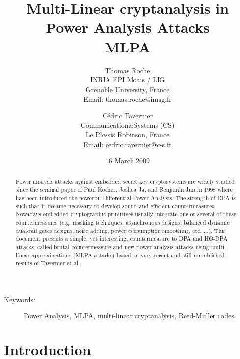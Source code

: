 \documentclass[11pt,a4paper]{article}
\title{Multi-Linear cryptanalysis in Power Analysis Attacks \\ MLPA}
\author{
Thomas Roche \\
INRIA EPI Moais / LIG \\
Grenoble University, France \\
Email: thomas.roche@imag.fr
\and
C\'{e}dric Tavernier \\
Communication\&Systems (CS)\\
 Le Plessis Robinson, France \\
Email: cedric.tavernier@c-s.fr
}
\date{16 March 2009}
\begin{document}
\maketitle

\begin{abstract}
Power analysis attacks against embedded secret key cryptosystems are widely studied since the seminal paper of Paul Kocher, Joshua Ja, and Benjamin Jun in 1998 where has been introduced 
the powerful Differential Power Analysis. The strength of DPA is such that it became necessary to develop sound and efficient countermeasures. Nowadays embedded cryptographic primitives 
usually integrate one or several of these countermeasures (e.g. masking techniques, asynchronous designs, balanced dynamic dual-rail gates designs, noise adding, power consumption smoothing, etc. ...).
This document presents a simple, yet interesting,  countermeasure to DPA and HO-DPA attacks, called brutal countermeasure and 
new power analysis attacks using multi-linear approximations (MLPA attacks) based on very recent and still unpublished results of Tavernier et al..
\end{abstract}

\begin{description}
\item[Keywords:] Power Analysis, MLPA, multi-linear cryptanalysis, Reed-Muller codes.
\end{description}

\section{Introduction}      \label{sec:Introduction}
\end{document}
